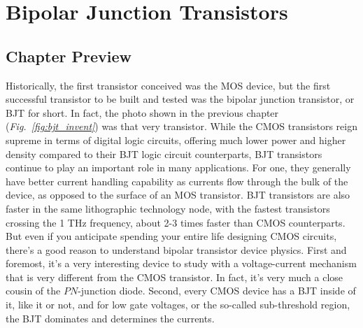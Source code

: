 \chapter{Bipolar Junction Transistors}
\label{ch:ch11_bjt}
\graphicspath{{./figs_bjt/}}
\section{Chapter Preview}
Historically, the first transistor conceived was the MOS device, but the first successful transistor to be built and tested was the bipolar junction transistor, or BJT for short.  In fact, the photo shown in the previous chapter (\emph{Fig.~\ref{fig:bjt_invent}}) was that very transistor.  While the CMOS transistors reign supreme in terms of digital logic circuits, offering much lower power and higher density compared to their BJT logic circuit counterparts, BJT transistors continue to play an important role in many applications.  For one, they generally have better current handling capability as currents flow through the bulk of the device, as opposed to the surface of an MOS transistor.  BJT transistors are also faster in the same lithographic technology node, with the fastest transistors crossing the 1 THz frequency, about 2-3 times faster than CMOS counterparts.  But even if you anticipate spending your entire life designing CMOS circuits, there's a good reason to understand bipolar transistor device physics.  First and foremost, it's a very interesting device to study with a voltage-current mechanism that is very different from the CMOS transistor.  In fact, it's very much a close cousin of the $PN$-junction diode.  Second, every CMOS device has a BJT inside of it, like it or not, and for low gate voltages, or the so-called sub-threshold region, the BJT dominates and determines the currents.  


